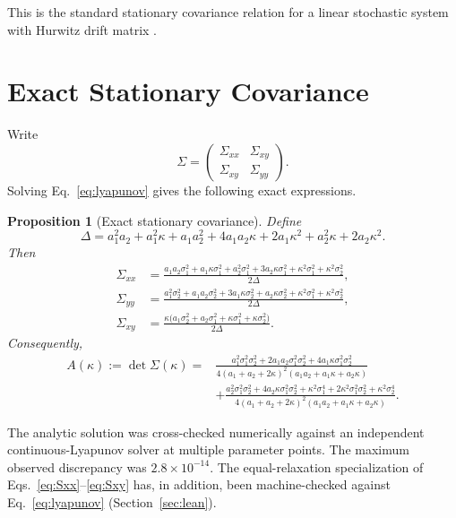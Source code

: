 \documentclass[11pt]{article}
\theoremstyle{plain}
\newtheorem{proposition}{Proposition}
\theoremstyle{remark}
\begin{document}
This is the standard stationary covariance relation for a linear stochastic system with Hurwitz
drift matrix \cite{Gardiner2004,Vatiwutipong2019}.

\section{Exact Stationary Covariance}

Write
\[
  \Sigma=\begin{pmatrix}\Sigma_{xx}&\Sigma_{xy}\\ \Sigma_{xy}&\Sigma_{yy}\end{pmatrix}.
\]
Solving Eq.~\eqref{eq:lyapunov} gives the following exact expressions.

\begin{proposition}[Exact stationary covariance]\label{prop:cov}
Define
\begin{equation}
  \Delta = a_1^2a_2+a_1^2\kappa+a_1a_2^2+4a_1a_2\kappa+2a_1\kappa^2+a_2^2\kappa+2a_2\kappa^2.
  \label{eq:Delta}
\end{equation}
Then
\begin{align}
  \Sigma_{xx} &= \frac{a_1a_2\sigma_1^2+a_1\kappa\sigma_1^2+a_2^2\sigma_1^2
    +3a_2\kappa\sigma_1^2+\kappa^2\sigma_1^2+\kappa^2\sigma_2^2}{2\Delta}, \label{eq:Sxx}\\[2pt]
  \Sigma_{yy} &= \frac{a_1^2\sigma_2^2+a_1a_2\sigma_2^2+3a_1\kappa\sigma_2^2
    +a_2\kappa\sigma_2^2+\kappa^2\sigma_1^2+\kappa^2\sigma_2^2}{2\Delta}, \label{eq:Syy}\\[2pt]
  \Sigma_{xy} &= \frac{\kappa\bigl(a_1\sigma_2^2+a_2\sigma_1^2+\kappa\sigma_1^2
    +\kappa\sigma_2^2\bigr)}{2\Delta}. \label{eq:Sxy}
\end{align}
Consequently,
\begin{equation}
\begin{split}
  A(\kappa):=\det\Sigma(\kappa)
  ={}&\frac{a_1^2\sigma_1^2\sigma_2^2+2a_1a_2\sigma_1^2\sigma_2^2
       +4a_1\kappa\sigma_1^2\sigma_2^2}{4(a_1+a_2+2\kappa)^2(a_1a_2+a_1\kappa+a_2\kappa)}\\
    &+\frac{a_2^2\sigma_1^2\sigma_2^2+4a_2\kappa\sigma_1^2\sigma_2^2
       +\kappa^2\sigma_1^4+2\kappa^2\sigma_1^2\sigma_2^2
       +\kappa^2\sigma_2^4}{4(a_1+a_2+2\kappa)^2(a_1a_2+a_1\kappa+a_2\kappa)}.
\end{split}
\label{eq:Ageneral}
\end{equation}
\end{proposition}

The analytic solution was cross-checked numerically against an independent continuous-Lyapunov
solver at multiple parameter points. The maximum observed discrepancy was $2.8\times10^{-14}$.
The equal-relaxation specialization of Eqs.~\eqref{eq:Sxx}--\eqref{eq:Sxy} has, in addition,
been machine-checked against Eq.~\eqref{eq:lyapunov} (Section~\ref{sec:lean}).
\end{document}
